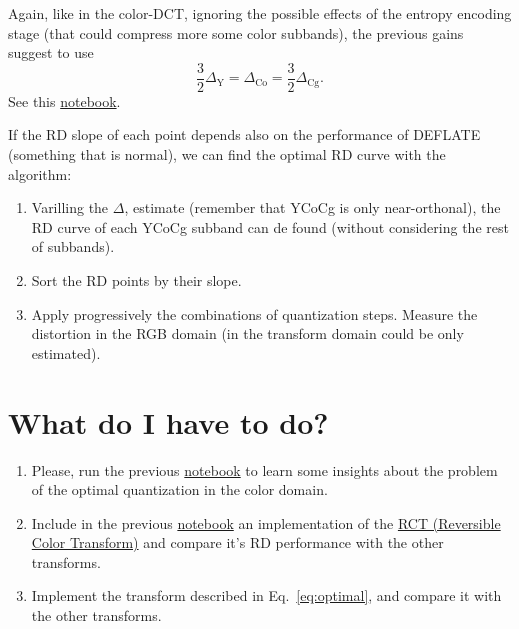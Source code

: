 
Again, like in the color-DCT, ignoring the possible effects of the
entropy encoding stage (that could compress more some color subbands),
the previous gains suggest to use
\begin{equation}
  \frac{3}{2}\Delta_{\text{Y}} = \Delta_{\text{Co}} = \frac{3}{2}\Delta_{\text{Cg}}.
\end{equation}
See this \href{https://github.com/Sistemas-Multimedia/Sistemas-Multimedia.github.io/blob/master/milestones/06-YUV_compression/YCrCb_matrix.ipynb}{notebook}.

If the RD slope of each point depends also on the performance of DEFLATE (something that is normal), we can find the optimal RD curve with the algorithm:
\begin{enumerate}
\item Varilling the $\Delta$, estimate (remember that YCoCg is only  near-orthonal), the RD curve of each YCoCg subband can de found (without considering the rest of subbands).
\item Sort the RD points by their slope.
\item Apply progressively the combinations of quantization
  steps. Measure the distortion in the RGB domain (in the transform
  domain could be only estimated).
\end{enumerate}


\section{What do I have to do?}

\begin{enumerate}
\item Please, run the previous
  \href{https://github.com/Sistemas-Multimedia/Sistemas-Multimedia.github.io/blob/master/study_guide/06-color_transform/performance.ipynb}{notebook}
  to learn some insights about the problem of the optimal
  quantization in the color domain.
\item Include in the previous
  \href{https://github.com/Sistemas-Multimedia/Sistemas-Multimedia.github.io/blob/master/study_guide/06-color_transform/performance.ipynb}{notebook}
  an implementation of the
  \href{https://en.wikipedia.org/wiki/JPEG_2000#Color_components_transformation}{RCT
    (Reversible Color Transform)} and compare it's RD performance with
  the other transforms.
\item Implement the transform described in Eq.~\ref{eq:optimal}, and
  compare it with the other transforms.
\end{enumerate}

